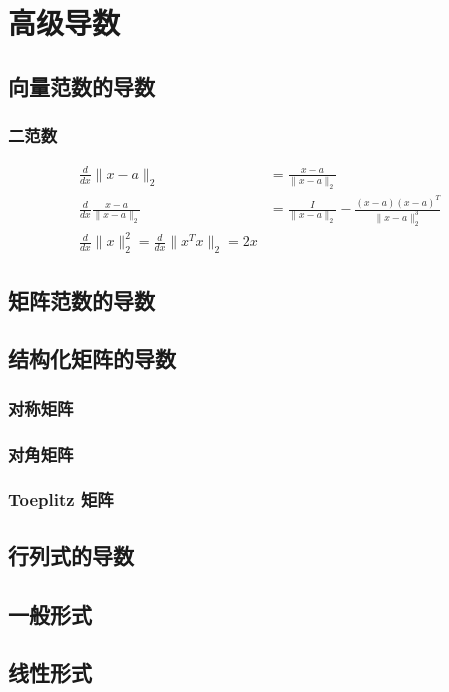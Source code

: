 
\chapter{高级导数}

\section{向量范数的导数}

\subsection{二范数}
\begin{align}
   \frac{d}{dx}\|x-a\|_2 &= \frac{x-a}{\|x-a\|_2}
   \\
   \frac{d}{dx}\frac{x-a}{\|x-a\|_2} &= \frac{I}{\|x-a\|_2} - \frac{(x-a)(x-a)^T}{\|x-a\|_2^3}
   \\
   \frac{d}{dx}\|x\|_2^2 = \frac{d}{dx}\|x^T x\|_2 = 2x
\end{align}

\section{矩阵范数的导数}

\section{结构化矩阵的导数}

\subsection{对称矩阵}
\subsection{对角矩阵}
\subsection{Toeplitz 矩阵}

\section{行列式的导数}
\section{一般形式}
\section{线性形式}
